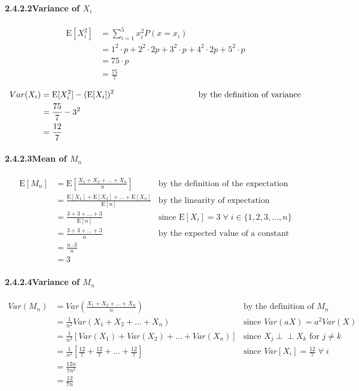 \documentclass[12pt, a4paper, titlepage, fleqn]{article}
\begin{document}
\paragraph{2.4.2.2\quad Variance of $X_i$}
\begin{align}
	\text{E}[X_i^2] &= \sum_{i=1}^{5} x_i^2 P(x=x_i)
	\\
	&= 1^2 \cdot p + 2^2 \cdot 2p + 3^2 \cdot p + 4^2 \cdot 2p + 5^2 \cdot p
	\\
	&= 75 \cdot p
	\\
	&= \frac{75}{7}	
\end{align}

\vspace{-16pt}

\begin{align}
	Var(X_i) &= \text{E}[X_i^2]-(\text{E}[X_i])^2 \hspace{3.2cm} &\text{by the definition of variance}
	\\
	&= \frac{75}{7} - 3^2
	\\
	&= \frac{12}{7}
\end{align}

\paragraph{2.4.2.3\quad Mean of $M_n$}
\begin{align}
	\text{E}[M_n] &= \text{E}[\frac{X_1+X_2+\dots+X_n}{n}] &\text{by the definition of the expectation}	
	\\
	&= \frac{\text{E}[X_1]+\text{E}[X_2]+\dots+\text{E}[X_n]}{\text{E}[n]}	&\text{by the linearity of expectation}
	\\
	&= \frac{3+3+\dots+3}{\text{E}[n]}	&\text{since E$[X_i]=3 \; \forall \; i \in \{1,2,3,\dots,n\}$}
	\\
	&= \frac{3+3+\dots+3}{n}	&\text{by the expected value of a constant}
	\\
	&= \frac{n \cdot 3}{n}
	\\
	&= 3
\end{align}
	
\paragraph{2.4.2.4\quad Variance of $M_n$}
\begin{align}
	Var(M_n) &= Var(\frac{X_1+X_2+\dots+X_n}{n}) &\text{by the definition of $M_n$}
	\\
	&= \frac{1}{n^2}Var(X_1+X_2+\dots+X_n) &\text{since $Var(aX)=a^2Var(X)$}
	\\
	&= \frac{1}{n^2}[Var(X_1)+Var(X_2)+\dots+Var(X_n)] &\text{since $X_j \perp\!\!\!\perp X_k$ for $j \neq k$}
	\\
	&= \frac{1}{n^2}[\frac{12}{7} + \frac{12}{7} + \dots + \frac{12}{7}] &\text{since $Var[X_i]=\frac{12}{7} \; \forall \; i$}
	\\
	&= \frac{12n}{7n^2} 
	\\
	&= \frac{12}{7n}
\end{align}
\end{document}
